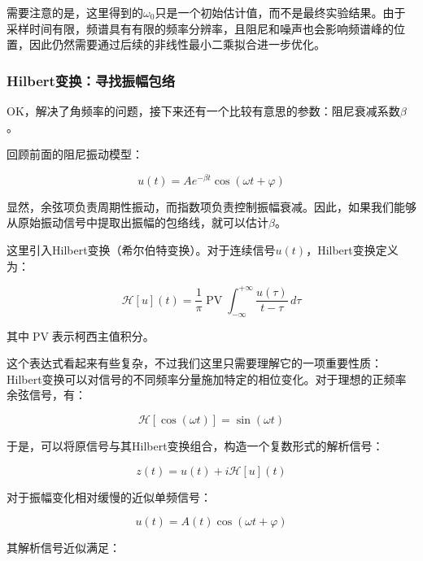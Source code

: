 \documentclass[UTF8]{ctexart}
\begin{document}
\noindent 需要注意的是，这里得到的$\omega_0$只是一个初始估计值，而不是最终实验结果。由于采样时间有限，频谱具有有限的频率分辨率，且阻尼和噪声也会影响频谱峰的位置，因此仍然需要通过后续的非线性最小二乘拟合进一步优化。

\subsubsection{Hilbert变换：寻找振幅包络}

\noindent OK，解决了角频率的问题，接下来还有一个比较有意思的参数：阻尼衰减系数$\beta$。

\noindent 回顾前面的阻尼振动模型：

\begin{equation}
u(t)=Ae^{-\beta t}\cos(\omega t+\varphi)
\end{equation}

\noindent 显然，余弦项负责周期性振动，而指数项负责控制振幅衰减。因此，如果我们能够从原始振动信号中提取出振幅的包络线，就可以估计$\beta$。

\noindent 这里引入Hilbert变换（希尔伯特变换）。对于连续信号$u(t)$，Hilbert变换定义为：

\begin{equation}
\mathcal{H}[u](t)
=\frac{1}{\pi}\operatorname{PV}
\int_{-\infty}^{+\infty}
\frac{u(\tau)}{t-\tau}\,d\tau
\end{equation}

\noindent 其中$\operatorname{PV}$表示柯西主值积分。

\noindent 这个表达式看起来有些复杂，不过我们这里只需要理解它的一项重要性质：Hilbert变换可以对信号的不同频率分量施加特定的相位变化。对于理想的正频率余弦信号，有：

\begin{equation}
\mathcal{H}[\cos(\omega t)]=\sin(\omega t)
\end{equation}

\noindent 于是，可以将原信号与其Hilbert变换组合，构造一个复数形式的解析信号：

\begin{equation}
z(t)=u(t)+i\mathcal{H}[u](t)
\end{equation}

\noindent 对于振幅变化相对缓慢的近似单频信号：

\begin{equation}
u(t)=A(t)\cos(\omega t+\varphi)
\end{equation}

\noindent 其解析信号近似满足：
\end{document}
